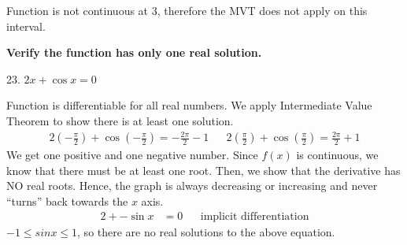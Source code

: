 \documentclass{article}
\begin{document}
\begin{description}
            Function is not continuous at 3, therefore the MVT does not apply on this interval.
      \item\textbf{Verify the function has only one real solution.}
            \begin{description}
                  \item 23. $2x + \cos{x} = 0$

                        Function is differentiable for all real numbers. We apply Intermediate Value Theorem to
                        show there is at least one solution.
                        \begin{align*}
                              2\left(-\frac{\pi}{2}\right) + \cos{\left(-\frac{\pi}{2}\right)} = -\frac{2\pi}{2} - 1 &  & 2\left(\frac{\pi}{2}\right) + \cos{\left(\frac{\pi}{2}\right)} = \frac{2\pi}{2} + 1
                        \end{align*}
                        We get one positive and one negative number. Since $f(x)$ is continuous, we know that there must
                        be at least one root. Then, we show that the derivative has NO real roots. Hence, the graph is
                        always decreasing or increasing and never ``turns'' back towards the $x$ axis.
                        \begin{align*}
                              2 + -\sin{x} & = 0 &  & \text{implicit differentiation}
                        \end{align*}
                        $-1 \leq sin{x} \leq 1$, so there are no real solutions to the above equation.


\end{description}
\end{description}
\end{document}
